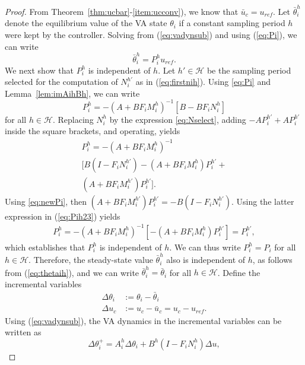 \documentclass[letterpaper, 10 pt, conference]{ieeeconf}
\newcommand{\Hset}{\mathcal{H}}
\begin{document}
\begin{proof}
  From Theorem~\ref{thm:ucbar}-\ref{item:ucconv}), we know that $\bar
  u_c = u_{ref}$. Let $\bar\theta_i^h$ denote the equilibrium value of
  the VA state $\theta_i$ if a constant sampling period $h$ were kept
  by the controller. Solving from (\ref{eq:vadynsub}) and using
  (\ref{eq:Pi}), we can write
  \begin{equation}
    \label{eq:thetaih}
    \bar\theta_i^h = P_i^h u_{ref}.
  \end{equation}
  We next show that $P_i^h$ is independent of $h$.  Let $h'\in\Hset$
  be the sampling period selected for the computation of $N_i^{h'}$ as
  in (\ref{eq:firstnih}). Using \eqref{eq:Pi} and
  Lemma~\ref{lem:imAihBh}, we can write
  \begin{equation}
    \label{eq:newPi}
    P_i^{h} = -(A+BF_iM_i^{h})^{-1} [B-BF_i N_i^{h}]
  \end{equation}
  for all $h\in\Hset$. Replacing $N_i^{h}$ by the expression
  \eqref{eq:Nselect}, adding $-AP_i^{h'}+AP_i^{h'}$ inside the square
  brackets, and operating, yields
  \begin{multline}
   \label{eq:Pih23}
     P_i^{h} = -(A+BF_iM_i^{h})^{-1} \\
     \big[B(I-F_i N_i^{h'}) - (A+BF_i M_i^{h}) P_i^{h'} +
     \\(A+BF_iM_i^{h'})P_i^{h'}\big].
  \end{multline}
  Using \eqref{eq:newPi}, then $(A+BF_i M_i^{h'})P_i^{h'} =
  -B(I-F_iN_i^{h'})$. Using the latter expression in (\ref{eq:Pih23})
  yields
   \begin{align*}
     P_i^{h} = -(A+BF_iM_i^{h})^{-1} [- (A+BF_i M_i^{h})P_i^{h'}] = P_i^{h'},
  \end{align*}
  which establishes that $P_i^h$ is independent of $h$. We can thus
  write $P_i^h = P_i$ for all $h\in \Hset$. Therefore, the
  steady-state value $\bar\theta_i^h$ also is independent of $h$, as
  follows from (\ref{eq:thetaih}), and we can write $\bar\theta_i^h =
  \bar\theta_i$ for all $h\in\Hset$. Define the incremental variables
  \begin{align}
    \label{eq:deltatheta}
     \Delta \theta_i &:=  \theta_i - \bar\theta_i \\
     \Delta u_c &:= u_c - \bar u_c = u_c - u_{ref}.
  \end{align}
  Using (\ref{eq:vadynsub}), the VA dynamics in the incremental
  variables can be written as
  \begin{equation*}
    \Delta\theta_i^+ = A_i^h \Delta\theta_i + B^h (I-F_i N_i^h) \Delta u,

\end{equation*}
\end{proof}
\end{document}
